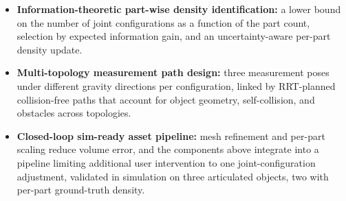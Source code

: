 \begin{itemize}
    \item \textbf{Information-theoretic part-wise density identification:} a
    lower bound on the number of joint configurations as a function of the part
    count, selection by expected information gain, and an uncertainty-aware
    per-part density update.

    \item \textbf{Multi-topology measurement path design:} three measurement
    poses under different gravity directions per configuration, linked by
    RRT-planned collision-free paths that account for object geometry,
    self-collision, and obstacles across topologies.

    \item \textbf{Closed-loop sim-ready asset pipeline:} mesh refinement
    and per-part scaling reduce volume error, and the components above integrate
    into a pipeline limiting additional user intervention to one
    joint-configuration adjustment, validated in
    simulation on three articulated objects, two with per-part ground-truth
    density.
\end{itemize}

